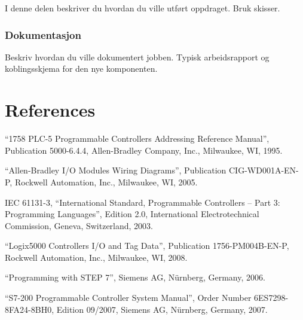 I denne delen beskriver du hvordan du ville utført oppdraget. Bruk skisser. 


\subsubsection*{Dokumentasjon}

Beskriv hvordan du ville dokumentert jobben. Typisk arbeidsrapport og koblingsskjema for den nye komponenten. 



\filbreak


\vskip 10pt



\filbreak




\vskip 10pt


\filbreak



\section*{References}


\noindent
``1758 PLC-5 Programmable Controllers Addressing Reference Manual'', Publication 5000-6.4.4, Allen-Bradley Company, Inc., Milwaukee, WI, 1995.

\vskip 10pt

\noindent
``Allen-Bradley I/O Modules Wiring Diagrams'', Publication CIG-WD001A-EN-P, Rockwell Automation, Inc., Milwaukee, WI, 2005.

\vskip 10pt

\noindent
IEC 61131-3, ``International Standard, Programmable Controllers -- Part 3: Programming Languages'', Edition 2.0, International Electrotechnical Commission, Geneva, Switzerland, 2003.

\vskip 10pt

\noindent
``Logix5000 Controllers I/O and Tag Data'', Publication 1756-PM004B-EN-P, Rockwell Automation, Inc., Milwaukee, WI, 2008.

\vskip 10pt

\noindent
``Programming with STEP 7'', Siemens AG, N\"urnberg, Germany, 2006.

\vskip 10pt

\noindent
``S7-200 Programmable Controller System Manual'', Order Number 6ES7298-8FA24-8BH0, Edition 09/2007, Siemens AG, N\"urnberg, Germany, 2007.

